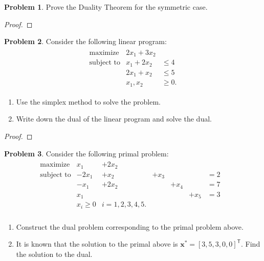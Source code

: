 \documentclass[12pt]{article}
\theoremstyle{definition}
\newtheorem{problem}{Problem}
\newcommand{\vc}[1]{\boldsymbol{#1}}
\newcommand{\tran}{\mathsf{T}}
\begin{document}
\begin{problem}
  Prove the Duality Theorem for the symmetric case.
\end{problem}

\begin{proof}
\end{proof}
\newpage


\begin{problem}
  Consider the following linear program:
  \begin{align*}
    \begin{array}{rrl}
      \text{maximize} & 2x_1 + 3x_2 & \\
      \text{subject to} & x_1 + 2x_2 &\leq 4 \\
      & 2x_1 + x_2 &\leq 5 \\
      & x_1, x_2 &\geq 0.
    \end{array}
  \end{align*}
  \begin{enumerate}
    \item Use the simplex method to solve the problem.
    \item Write down the dual of the linear program and solve the dual.
  \end{enumerate}
\end{problem}

\begin{proof}
\end{proof}
\newpage


\begin{problem}
  Consider the following primal problem:
  \begin{align*}
    \begin{array}{rllllll}
      \text{maximize} & x_1 &+ 2x_2 & & & & \\
      \text{subject to} & -2x_1 &+ x_2 &+ x_3 & & &= 2 \\
      & -x_1 &+ 2x_2& &+ x_4 & &= 7 \\
      & x_1 &&& &+ x_5 &= 3 \\
      &x_i \geq 0 & i= 1,2,3,4,5.& & & \\
    \end{array}
    \begin{array}{ll}
    \end{array}
  \end{align*}
  \begin{enumerate}
    \item Construct the dual problem corresponding to the primal problem above.
    \item It is known that the solution to the primal above is $\vc{x}^{*} = [3,5,3,0,0]^\tran$.
      Find the solution to the dual.
  \end{enumerate}
\end{problem}
\end{document}
